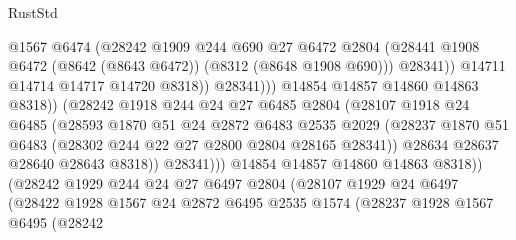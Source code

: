 \begin{lexlean}{RustStd}
\begin{coremodule}
                                    @1567
                                    @6474
                                    (@28242
                                      @1909
                                      @244
                                      @690
                                      @27
                                      @6472
                                      @2804
                                      (@28441
                                        @1908
                                        @6472
                                        (@8642 (@8643 @6472))
                                        (@8312 (@8648 @1908 @690)))
                                      @28341))
                                  @14711
                                  @14714
                                  @14717
                                  @14720
                                  @8318))
                              @28341)))
                        @14854
                        @14857
                        @14860
                        @14863
                        @8318))
                    (@28242
                      @1918
                      @244
                      @24
                      @27
                      @6485
                      @2804
                      (@28107
                        @1918
                        @24
                        @6485
                        (@28593
                          @1870
                          @51
                          @24
                          @2872
                          @6483
                          @2535
                          @2029
                          (@28237 @1870 @51 @6483 (@28302 @244 @22 @27 @2800 @2804 @28165 @28341))
                          @28634
                          @28637
                          @28640
                          @28643
                          @8318))
                      @28341)))
                @14854
                @14857
                @14860
                @14863
                @8318))
            (@28242
              @1929
              @244
              @24
              @27
              @6497
              @2804
              (@28107
                @1929
                @24
                @6497
                (@28422
                  @1928
                  @1567
                  @24
                  @2872
                  @6495
                  @2535
                  @1574
                  (@28237
                    @1928
                    @1567
                    @6495
                    (@28242

\end{coremodule}
\end{lexlean}
